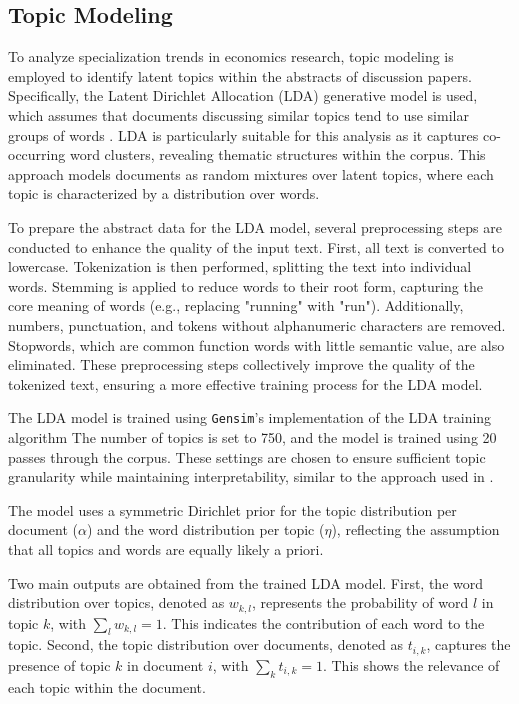 \documentclass[11pt, a4paper, leqno]{article}
\begin{document}
\subsection{Topic Modeling}

To analyze specialization trends in economics research, topic modeling is employed to identify latent topics within the abstracts of discussion papers.
Specifically, the Latent Dirichlet Allocation (LDA) generative model is used, which assumes that documents discussing similar topics tend to use similar groups of words \cite{blei2003}.
LDA is particularly suitable for this analysis as it captures co-occurring word clusters, revealing thematic structures within the corpus.
This approach models documents as random mixtures over latent topics, where each topic is characterized by a distribution over words.

To prepare the abstract data for the LDA model, several preprocessing steps are conducted to enhance the quality of the input text.
First, all text is converted to lowercase.
Tokenization is then performed, splitting the text into individual words.
Stemming is applied to reduce words to their root form, capturing the core meaning of words (e.g., replacing "running" with "run").
Additionally, numbers, punctuation, and tokens without alphanumeric characters are removed.
Stopwords, which are common function words with little semantic value, are also eliminated.
These preprocessing steps collectively improve the quality of the tokenized text, ensuring a more effective training process for the LDA model.

The LDA model is trained using \texttt{Gensim}'s implementation of the LDA training algorithm
The number of topics is set to 750, and the model is trained using 20 passes through the corpus.
These settings are chosen to ensure sufficient topic granularity while maintaining interpretability, similar to the approach used in \cite{galiani2023a}.

The model uses a symmetric Dirichlet prior for the topic distribution per document ($\alpha$) and the word distribution per topic ($\eta$), reflecting the assumption that all topics and words are equally likely a priori.

Two main outputs are obtained from the trained LDA model. First, the word distribution over topics, denoted as $w_{k,l}$, represents the probability of word $l$ in topic $k$, with $\sum_l w_{k,l} = 1$.
This indicates the contribution of each word to the topic.
Second, the topic distribution over documents, denoted as $t_{i,k}$, captures the presence of topic $k$ in document $i$, with $\sum_k t_{i,k} = 1$.
This shows the relevance of each topic within the document.
\end{document}
